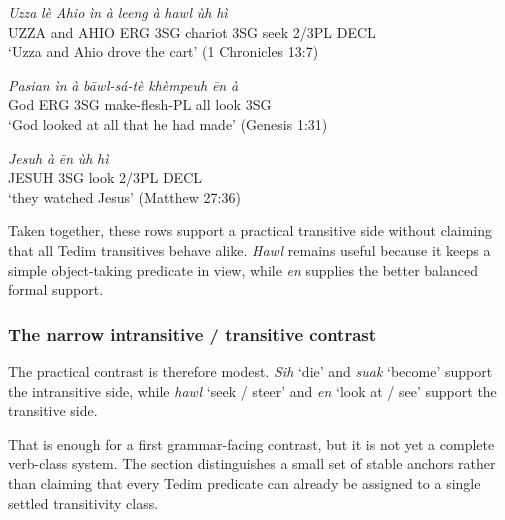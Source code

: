\documentclass[
  11pt,
  a4paper,
]{article}
\newcommand{\tdim}[1]{\textit{#1}}
\newcommand{\tdimword}[1]{\textit{#1}}
\renewcommand{\textsc}[1]{{\footnotesize\MakeUppercase{#1}}}
\newcommand{\glossquote}[1]{`#1'}
\begin{document}
\begin{exe}
\ex \label{ex:trans-hawl-1chr13}
\gll \tdimword{Uzza} \tdimword{lè} \tdimword{Ahio} \tdimword{ìn} \tdimword{à} \tdimword{leeng} \tdimword{à} \tdimword{hawl} \tdimword{ùh} \tdimword{hì} \\
     \textsc{uzza} and \textsc{ahio} \textsc{erg} \textsc{3sg} chariot \textsc{3sg} seek 2/3PL \textsc{decl} \\
\glt \glossquote{Uzza and Ahio drove the cart} (1 Chronicles 13:7)
\end{exe}

\begin{exe}
\ex \label{ex:trans-en-gen1}
\gll \tdimword{Pasian} \tdimword{ìn} \tdimword{à} \tdimword{bāwl-sá-tè} \tdimword{khèmpeuh} \tdimword{ēn} \tdimword{à} \\
     God \textsc{erg} \textsc{3sg} make-flesh-\textsc{pl} all look \textsc{3sg} \\
\glt \glossquote{God looked at all that he had made} (Genesis 1:31)
\end{exe}

\begin{exe}
\ex \label{ex:trans-en-matt27}
\gll \tdimword{Jesuh} \tdimword{à} \tdimword{ēn} \tdimword{ùh} \tdimword{hì} \\
     \textsc{jesuh} \textsc{3sg} look 2/3PL \textsc{decl} \\
\glt \glossquote{they watched Jesus} (Matthew 27:36)
\end{exe}

Taken together, these rows support a practical transitive side without
claiming that all Tedim transitives behave alike. \tdim{Hawl} remains
useful because it keeps a simple object-taking predicate in view, while
\tdim{en} supplies the better balanced formal support.

\subsubsection{The narrow intransitive / transitive
contrast}\label{the-narrow-intransitive-transitive-contrast}

The practical contrast is therefore modest. \tdim{Sih} \glossquote{die}
and \tdim{suak} \glossquote{become} support the intransitive side, while
\tdim{hawl} \glossquote{seek / steer} and \tdim{en}
\glossquote{look at / see} support the transitive side.

That is enough for a first grammar-facing contrast, but it is not yet a
complete verb-class system. The section distinguishes a small set of
stable anchors rather than claiming that every Tedim predicate can
already be assigned to a single settled transitivity class.
\end{document}
